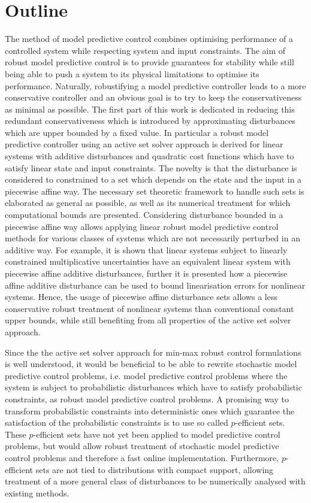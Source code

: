 \documentclass{article}
\begin{document}
\section*{Outline}

The method of model predictive control combines optimising performance of a controlled system while respecting 
system and input constraints.
%
The aim of robust model predictive control is to provide guarantees for stability while still being able to push
a system to its physical limitations to optimise its performance.
%
Naturally, robustifying a model predictive controller leads to a more conservative controller and an obvious goal is
to try to keep the conservativeness as minimal as possible.
%
The first part of this work is dedicated in reducing this redundant conservativeness which is introduced by approximating
disturbances which are upper bounded by a fixed value.
%
In particular a robust model predictive controller using an active set solver approach is derived for linear systems
with additive disturbances and quadratic cost functions which have to satisfy linear state and input constraints.
%
The novelty is that the disturbance is considered to constrained to a set which depends on the state and the input in
a piecewise affine way.
%
The necessary set theoretic framework to handle such sets is elaborated as general as possible, as well as its numerical
treatment for which computational bounds are presented.
%
Considering disturbance bounded in a piecewise affine way allows applying linear robust model predictive control
methods for various classes of systems which are not necessarily perturbed in an additive way.
%
For example, it is shown that linear systems subject to linearly constrained multiplicative uncertainties have an
equivalent linear system with piecewise affine additive disturbances, further it is presented how a piecewise affine 
additive disturbance can be used to bound linearisation errors for nonlinear systems.
%
Hence, the usage of piecewise affine disturbance sets allows a less conservative robust treatment of nonlinear systems
than conventional constant upper bounds, while still benefiting from all properties of the active set solver approach.

Since the the active set solver approach for min-max robust control formulations is well understood, it would be beneficial
to be able to rewrite stochastic model predictive control problems, i.e. model predictive control problems where the system
is subject to probabilistic disturbances which have to satisfy probabilistic constraints, as robust model predictive control
problems.
%
A promising way to transform probabilistic constraints into deterministic ones which guarantee the satisfaction of the probabilistic
constraints is to use so called $p$-efficient sets.
%
These $p$-efficient sets have not yet been applied to model predictive control problems, but would allow robust treatment of stochastic
model predictive control problems and therefore a fast online implementation.
%
Furthermore, $p$-efficient sets are not tied to distributions with compact support, allowing treatment of a more general class of
disturbances to be numerically analysed with existing methods.
\pagebreak
\end{document}
